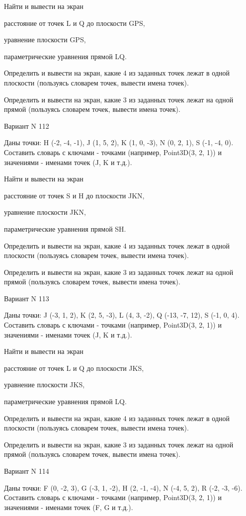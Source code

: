\documentclass[11pt]{report}
\begin{document}
Найти и вывести на экран


расстояние от точек L и Q до плоскости GPS,


уравнение плоскости GPS,


параметрические уравнения прямой LQ.


Определить и вывести на экран, какие 4 из заданных точек лежат в одной плоскости (пользуясь словарем точек, вывести имена точек).


Определить и вывести на экран, какие 3 из заданных точек лежат на одной прямой (пользуясь словарем точек, вывести имена точек).

\newpage
Вариант N 112

Даны точки: H (-2, -4, -1), J (1, 5, 2), K (1, 0, -3), N (0, 2, 1), S (-1, -4, 0).
Составить словарь с ключами - точками (например, Point3D(3, 2, 1)) и значениями - именами точек (J, K и т.д.).


Найти и вывести на экран


расстояние от точек S и H до плоскости JKN,


уравнение плоскости JKN,


параметрические уравнения прямой SH.


Определить и вывести на экран, какие 4 из заданных точек лежат в одной плоскости (пользуясь словарем точек, вывести имена точек).


Определить и вывести на экран, какие 3 из заданных точек лежат на одной прямой (пользуясь словарем точек, вывести имена точек).

\newpage
Вариант N 113

Даны точки: J (-3, 1, 2), K (2, 5, -3), L (4, 3, -2), Q (-13, -7, 12), S (-1, 0, 4).
Составить словарь с ключами - точками (например, Point3D(3, 2, 1)) и значениями - именами точек (J, K и т.д.).


Найти и вывести на экран


расстояние от точек L и Q до плоскости JKS,


уравнение плоскости JKS,


параметрические уравнения прямой LQ.


Определить и вывести на экран, какие 4 из заданных точек лежат в одной плоскости (пользуясь словарем точек, вывести имена точек).


Определить и вывести на экран, какие 3 из заданных точек лежат на одной прямой (пользуясь словарем точек, вывести имена точек).

\newpage
Вариант N 114

Даны точки: F (0, -2, 3), G (-3, 1, -2), H (2, -1, -4), N (-4, 5, 2), R (-2, -3, -6).
Составить словарь с ключами - точками (например, Point3D(3, 2, 1)) и значениями - именами точек (F, G и т.д.).
\end{document}
